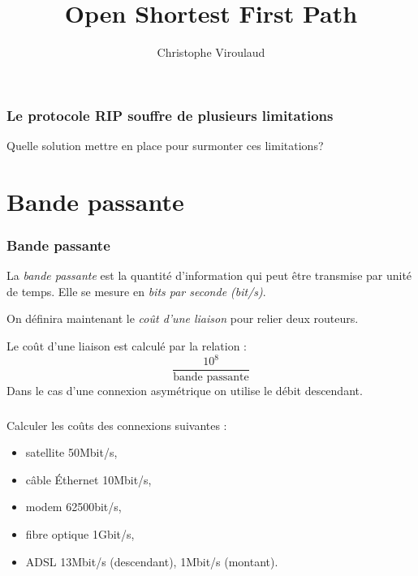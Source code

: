 \documentclass[svgnames,11pt]{beamer}
\author[]{Christophe Viroulaud}
\title{Open Shortest First Path}
\date{\framebox{\textbf{Archi 13}}}
\institute{Terminale - NSI}
\begin{document}
\begin{frame}
    \titlepage
\end{frame}

\begin{frame}
    \frametitle{Le protocole RIP souffre de plusieurs limitations}

    \begin{framed}
        \centering Quelle solution mettre en place pour surmonter ces limitations?
    \end{framed}

\end{frame}

\section{Bande passante}

\begin{frame}
    \frametitle{Bande passante}

    \begin{aretenir}[]
        La \emph{bande passante} est la quantité d'information qui peut être transmise par unité de temps. Elle se mesure en \emph{bits par seconde (bit/s)}.
    \end{aretenir}

\end{frame}

\begin{frame}
    On définira maintenant le \emph{coût d'une liaison} pour relier deux routeurs.

    \begin{aretenir}[]
        Le coût d'une liaison est calculé par la relation :
        $$\dfrac{10^8}{\mbox{bande passante}}$$
        Dans le cas d'une connexion asymétrique on utilise le débit descendant.
    \end{aretenir}
\end{frame}


\begin{frame}
    \frametitle{}

    \begin{activite}
        Calculer les coûts des connexions suivantes :
        \begin{itemize}
            \item satellite 50Mbit/s,
            \item câble Éthernet 10Mbit/s,
            \item modem 62500bit/s,
            \item fibre optique 1Gbit/s,
            \item ADSL 13Mbit/s (descendant), 1Mbit/s (montant).
        \end{itemize}
    \end{activite}

\end{frame}
\end{document}
